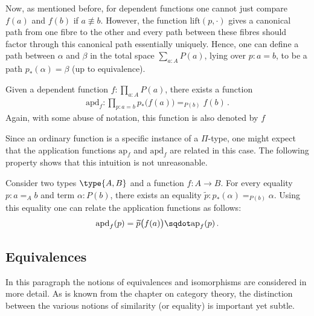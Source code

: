     Now, as mentioned before, for dependent functions one cannot just compare $f(a)$ and $f(b)$ if $a\not\equiv b$. However, the function $\mathrm{lift}(p,\cdot)$ gives a canonical path from one fibre to the other and every path between these fibres should factor through this canonical path essentially uniquely. Hence, one can define a path between $\alpha$ and $\beta$ in the total space $\sum_{a:A}P(a)$, lying over $p:a=b$, to be a path $p_*(\alpha)=\beta$ (up to equivalence).
    \begin{property}
        Given a dependent function $f:\prod_{a:A}P(a)$, there exists a function
        \begin{gather}
            \mathrm{apd}_f:\prod_{p:a=b}p_*\bigl(f(a)\bigr)=_{P(b)}f(b)\,.
        \end{gather}
        Again, with some abuse of notation, this function is also denoted by $f$
    \end{property}

    Since an ordinary function is a specific instance of a $\Pi$-type, one might expect that the application functions $\mathrm{ap}_f$ and $\mathrm{apd}_f$ are related in this case. The following property shows that this intuition is not unreasonable.
    \begin{property}
        Consider two types $\type{A,B}$ and a function $f:A\rightarrow B$. For every equality $p:a=_Ab$ and term $\alpha:P(b)$, there exists an equality $\widetilde{p}:p_*(\alpha)=_{P(b)}\alpha$. Using this equality one can relate the application functions as follows:
        \begin{gather}
            \mathrm{apd}_f(p) = \widetilde{p}\bigl(f(a)\bigr)\sqdot\mathrm{ap}_f(p)\,.
        \end{gather}
    \end{property}

\subsection{Equivalences}

    In this paragraph the notions of equivalences and isomorphisms are considered in more detail. As is known from the chapter on category theory, the distinction between the various notions of similarity (or equality) is important yet subtle.

